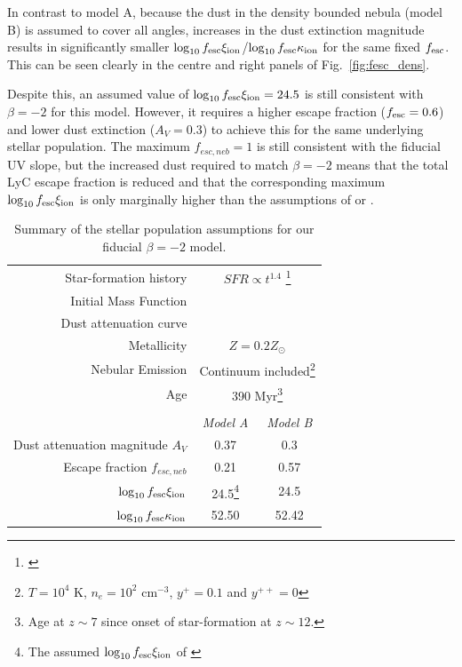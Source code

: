 In contrast to model A, because the dust in the density bounded nebula (model B) is assumed to cover all angles, increases in the dust extinction magnitude results in significantly smaller $\log_{10}f_{\rm{esc}}\xi_{\rm{ion}}$/$\log_{10}f_{\rm{esc}}\kappa_{\rm{ion}}$ for the same fixed $f_{\rm{esc}}$. This can be seen clearly in the centre and right panels of Fig.~\ref{fig:fesc_dens}.

Despite this, an assumed value of $\log_{10}f_{\rm{esc}}\xi_{\rm{ion}} = 24.5$ is still consistent with $\beta = -2$ for this model. However, it requires a higher escape fraction ($f_{\rm{esc}} = 0.6$) and lower dust extinction ($A_{V} = 0.3$) to achieve this for the same underlying stellar population. The maximum $f_{esc,neb} = 1$ is still consistent with the fiducial UV slope, but the increased dust required to match $\beta = -2$ means that the total LyC escape fraction is reduced and that the corresponding maximum $\log_{10}f_{\rm{esc}}\xi_{\rm{ion}}$ is only marginally higher than the assumptions of \citep{Kuhlen:2012ka} or \citep{Robertson:2013ji}. 

\begin{table}
  \caption{Summary of the stellar population assumptions for our fiducial $\beta = -2$ model.}
    \centering
    \begin{minipage}\textwidth
    \centering
  \begin{tabular}{r|c c}
    \hline
     Star-formation history & \multicolumn{2}{c}{$SFR \propto t^{1.4}$ \footnote{\citet{Salmon:2014tm}}}\\
    Initial Mass Function & \multicolumn{2}{c}{\citet{Chabrier:2003ki}} \\
    Dust attenuation curve & \multicolumn{2}{c}{\citet{2000ApJ...533..682C}} \\
    Metallicity & \multicolumn{2}{c}{ $Z = 0.2 Z_{\odot}$ }\\
    Nebular Emission & \multicolumn{2}{c}{Continuum included\footnote{$T=10^4$ K, $n_{e}=10^2$ cm$^{-3}$, $y^{+} = 0.1$ and $y^{++} = 0$}}\\
    Age & \multicolumn{2}{c}{390 Myr\footnote{Age at $z\sim7$ since onset of star-formation at $z\sim12$.}}\\
    & & \\
    & \emph{Model A} & \emph{Model B} \\
    Dust attenuation magnitude $A_{V}$ & 0.37 & 0.3 \\
    Escape fraction $f_{esc,neb}$ & 0.21 & 0.57  \\
    $\log_{10} f_{\rm{esc}}\xi_{\rm{ion}}$ & 24.5\footnote{The assumed  $\log_{10} f_{\rm{esc}}\xi_{\rm{ion}}$ of \citet{Robertson:2013ji}} & 24.5 \\ 
    $\log_{10} f_{\rm{esc}}\kappa_{\rm{ion}}$ & 52.50 & 52.42 \\ 
    \hline   
  \end{tabular}
  \label{tab:fiducial}
  \end{minipage}
\end{table}

